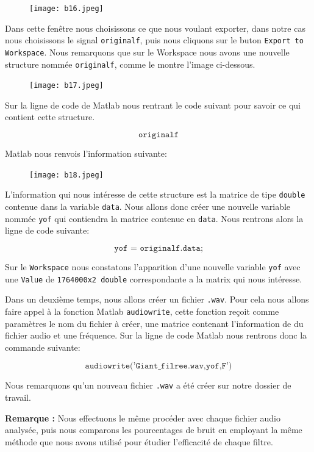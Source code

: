 \documentclass[conference,onecolumn]{IEEEtran}
\begin{document}
 \begin{figure}[H]
 \centering
    \texttt{[image: b16.jpeg]}
\end{figure}


Dans cette fenêtre nous choisissons ce que nous voulant exporter, dans notre cas nous choisissons le signal \texttt{originalf}, puis nous cliquons sur le buton \texttt{Export to Workspace}. Nous remarquons que sur le Workspace nous avons une nouvelle structure nommée \texttt{originalf}, comme le montre l'image ci-dessous.

 \begin{figure}[H]
 \centering
    \texttt{[image: b17.jpeg]}
\end{figure}


Sur la ligne de code de Matlab nous rentrant le code suivant pour savoir ce qui contient cette structure.

\[\texttt{originalf}\]

Matlab nous renvois l'information suivante:

 \begin{figure}[H]
 \centering
    \texttt{[image: b18.jpeg]}
\end{figure}


L'information qui nous intéresse de cette structure est la matrice de tipe \texttt{double} contenue dans la variable \texttt{data}. Nous allons donc créer une nouvelle variable nommée \texttt{yof} qui contiendra la matrice contenue en \texttt{data}. Nous rentrons alors la ligne de code suivante:

\[\texttt{yof = originalf.data;}\]

Sur le \texttt{Workspace} nous constatons l'apparition d'une nouvelle variable \texttt{yof} avec une \texttt{Value} de \texttt{1764000x2 double} correspondante a la matrix qui nous intéresse.

Dans un deuxième temps, nous allons créer un fichier \texttt{.wav}. Pour cela nous allons faire appel à la fonction Matlab \texttt{audiowrite}, cette fonction reçoit comme paramètres le nom du fichier à créer, une matrice contenant l'information de du fichier audio et une fréquence. Sur la ligne de code Matlab nous rentrons donc la commande suivante:

\[\texttt{audiowrite('Giant\_filree.wav,yof,F')}\]

Nous remarquons qu'un nouveau fichier \texttt{.wav} a été créer sur notre dossier de travail. 

\textbf{Remarque :} Nous effectuons le même procéder avec chaque fichier audio analysée, puis nous comparons les pourcentages de bruit en employant la même méthode que nous avons utilisé pour étudier l'efficacité de chaque filtre. 
\end{document}

